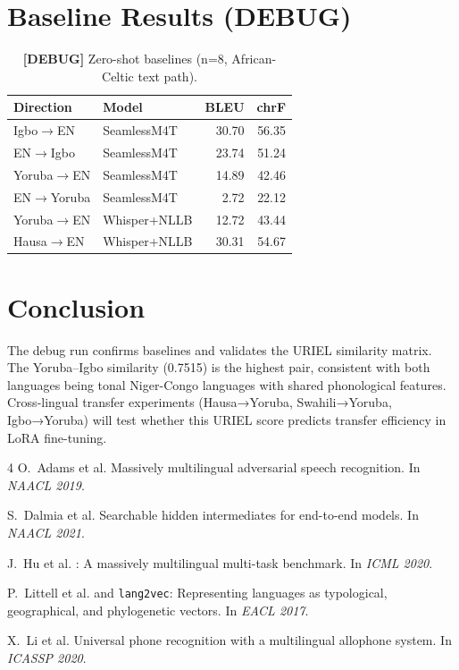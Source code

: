 \documentclass[11pt,a4paper]{article}
\begin{document}
\section{Baseline Results (DEBUG)}

\begin{table}[t]
\centering
\small
\caption{\textbf{[DEBUG]} Zero-shot baselines (n=8, African-Celtic text path).}
\label{tab:p5_debug}
\begin{tabular}{llrr}
\toprule
\textbf{Direction} & \textbf{Model} & \textbf{BLEU} & \textbf{chrF} \\
\midrule
Igbo$\to$EN   & SeamlessM4T  & 30.70 & 56.35 \\
EN$\to$Igbo   & SeamlessM4T  & 23.74 & 51.24 \\
Yoruba$\to$EN & SeamlessM4T  & 14.89 & 42.46 \\
EN$\to$Yoruba & SeamlessM4T  &  2.72 & 22.12 \\
Yoruba$\to$EN & Whisper+NLLB & 12.72 & 43.44 \\
Hausa$\to$EN  & Whisper+NLLB & 30.31 & 54.67 \\
\bottomrule
\end{tabular}
\end{table}

\section{Conclusion}
\label{sec:conclusion}

The debug run confirms baselines and validates the URIEL similarity matrix. The Yoruba–Igbo similarity (0.7515) is the highest pair, consistent with both languages being tonal Niger-Congo languages with shared phonological features. Cross-lingual transfer experiments (Hausa→Yoruba, Swahili→Yoruba, Igbo→Yoruba) will test whether this URIEL score predicts transfer efficiency in LoRA fine-tuning.




\begin{thebibliography}{4}
O.~Adams et al.
\newblock Massively multilingual adversarial speech recognition.
\newblock In \emph{NAACL 2019}.

S.~Dalmia et al.
\newblock Searchable hidden intermediates for end-to-end models.
\newblock In \emph{NAACL 2021}.

J.~Hu et al.
: A massively multilingual multi-task benchmark.
\newblock In \emph{ICML 2020}.

P.~Littell et al.
 and \texttt{lang2vec}: Representing languages as typological, geographical, and phylogenetic vectors.
\newblock In \emph{EACL 2017}.

X.~Li et al.
\newblock Universal phone recognition with a multilingual allophone system.
\newblock In \emph{ICASSP 2020}.
\end{thebibliography}
\end{document}

